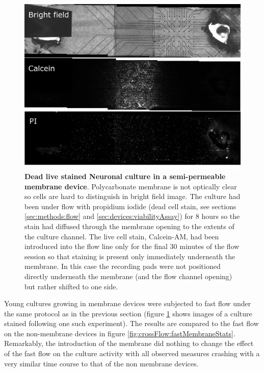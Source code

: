         \begin{figure}[!htb]
            \centering
            \includegraphics[width=15cm]{chapter5/figures/shiftedMembraneImage/shiftedMembrane.jpg}
            \caption[Bright field and staining images of a culture in a cross flow device inclusive of a semi-permeable membrane]{\textbf{Dead live stained Neuronal culture in a semi-permeable membrane device}. Polycarbonate membrane is not optically clear so cells are hard to distinguish in bright field image. The culture had been under flow with propidium iodide (dead cell stain, see sections \ref{sec:methods:flow} and \ref{sec:devices:viabilityAssay}) for 8 hours so the stain had diffused through the membrane opening to the extents of the culture channel. The live cell stain, Calcein-AM, had been introduced into the flow line only for the final 30 minutes of the flow session so that staining is present only immediately underneath the membrane. In this case the recording pads were not positioned directly underneath the membrane (and the flow channel opening) but rather shifted to one side.}
            \label{fig:crossFlow:shiftedMembrane}
        \end{figure}

        Young cultures growing in membrane devices were subjected to fast flow under the same protocol as in the previous section (figure \ref{fig:crossFlow:shiftedMembrane} shows images of a culture stained following one such experiment). The results are compared to the fast flow on the non-membrane devices in figure \ref{fig:crossFlow:fastMembraneStats}. Remarkably, the introduction of the membrane did nothing to change the effect of the fast flow on the culture activity with all observed measures crashing with a very similar time course to that of the non membrane devices.

